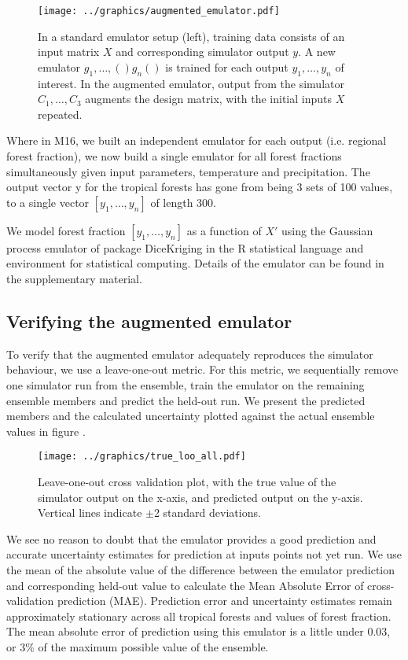 \documentclass[gmd, manuscript]{copernicus}
\begin{document}
\begin{figure}[t]
\texttt{[image: ../graphics/augmented\_emulator.pdf]}
\caption{In a standard emulator setup (left), training data consists of an input matrix $X$ and corresponding simulator output $y$. A new emulator $g_{1}, \ldots, ()g_{n}()$ is trained for each output $y_{1}, \ldots, y_{n}$ of interest. In the augmented emulator, output from the simulator $C_{1}, \ldots, C_{3}$ augments the design matrix, with the initial inputs $X$ repeated.}
\label{fig:augmented_emulator}
\end{figure}


Where in M16, we built an independent emulator for each output (i.e. regional forest fraction), we now build a single emulator for all forest fractions simultaneously given input parameters, temperature and precipitation. The output vector y for the tropical forests has gone from being 3 sets of 100 values, to a single vector $[y_{1}, \ldots,  y_{n}]$ of length 300.

We model forest fraction $[y_{1}, \ldots, y_{n}]$ as a function of $X'$ using the Gaussian process emulator of package DiceKriging \citep{roustant20XXdicekriging} in the R statistical language and environment for statistical computing. Details of the emulator can be found in the supplementary material.

\subsection{Verifying the augmented emulator}
To verify that the augmented emulator adequately reproduces the simulator behaviour, we use a leave-one-out metric. For this metric, we sequentially remove one simulator run from the ensemble, train the emulator on the remaining ensemble members and predict the held-out run. We present the predicted members and the calculated uncertainty plotted against the actual ensemble values in figure \cite{fig:true_loo_all}.

\begin{figure}[t]
\texttt{[image: ../graphics/true\_loo\_all.pdf]}
\caption{Leave-one-out cross validation plot, with the true value of the simulator output on the x-axis, and predicted output on the y-axis. Vertical lines indicate $\pm$2 standard deviations.
}
\label{fig:true_loo_all}
\end{figure}

We see no reason to doubt that the emulator provides a good prediction and accurate uncertainty estimates for prediction at inputs points not yet run. We use the mean of the absolute value of the difference between the emulator prediction and corresponding held-out value to calculate the Mean Absolute Error of cross-validation prediction (MAE). Prediction error and uncertainty estimates remain approximately stationary across all tropical forests and values of forest fraction. The mean absolute error of prediction using this emulator is a little under 0.03, or 3\% of the maximum possible value of the ensemble.
\end{document}
